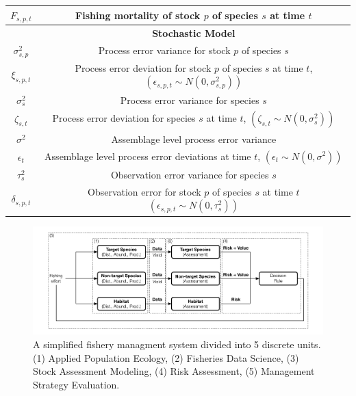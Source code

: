 \documentclass[]{scrartcl}
\begin{document}
\begin{table}[htbp]
\begin{center}
\begin{tabular}{c|c}
$F_{s,p,t}$ & Fishing mortality of stock $p$ of species $s$ at time $t$ \\
\hline
& \textbf{ Stochastic Model } \\
$\sigma_{s,p}^2$ & Process error variance for stock $p$ of species $s$ \\
$\xi_{s,p,t}$ & Process error deviation for stock $p$ of species $s$ at time $t$, $\left( \epsilon_{s,p,t} \sim N (0, \sigma_{s,p}^2) \right)$ \\
$\sigma_{s}^2$ & Process error variance for species $s$ \\
$\zeta_{s,t}$ & Process error deviation for species $s$ at time $t$, $\left( \zeta_{s,t} \sim N (0, \sigma_s^2) \right)$ \\
$\sigma^2$ & Assemblage level process error variance  \\
$\epsilon_{t}$ & Assemblage level process error deviations at time $t$, $\left( \epsilon_{t} \sim N (0, \sigma^2) \right)$ \\
$\tau_s^2$ & Observation error variance for species $s$ \\
$\delta_{s,p,t}$ & Observation error for stock $p$ of species $s$ at time $t$ $\left(\epsilon_{s,p,t} \sim N (0, \tau_s^2) \right)$ \\
\hline
\end{tabular}
\end{center}
\end{table}

\newpage

\begin{landscape}
\begin{figure}[htbp]
\centering
\includegraphics{figures/mscMSE.pdf}
\caption{A simplified fishery managment system divided into 5 discrete units. (1) Applied Population Ecology, (2) Fisheries Data Science, (3) Stock Assessment Modeling, (4) Risk Assessment, (5) Management Strategy Evaluation.}\label{fig:fishMgmt}
\end{figure}
\end{landscape}
\end{document}
